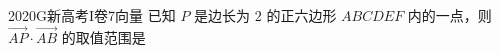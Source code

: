 
\begin{problem}{2020}{G}{新高考I卷}{7}{向量}
已知 $ P $ 是边长为 $ 2 $ 的正六边形 $ ABCDEF $ 内的一点，则 $ \overrightarrow{AP}\cdot\overrightarrow{AB} $ 的取值范围是
\begin{choices}
\end{choices}
\end{problem}

\begin{answer}

\end{answer}

\begin{solutions}

\end{solutions}